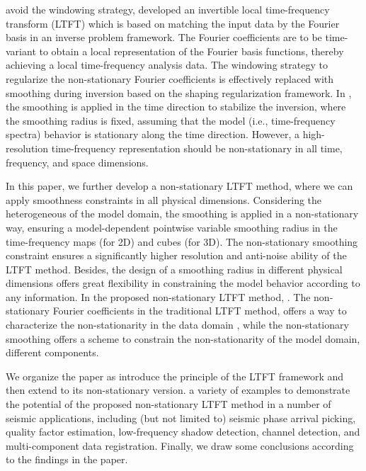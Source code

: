  avoid the windowing strategy, \cite{liuyang2012} developed an invertible local time-frequency transform (LTFT) which is based on matching the input data by the Fourier basis in an inverse problem framework. The Fourier coefficients are  to be time-variant to obtain a local representation of the Fourier basis functions, thereby achieving a local time-frequency analysis data. The windowing strategy to regularize the non-stationary Fourier coefficients is effectively replaced with smoothing during inversion based on the shaping regularization framework.  In \cite{liuyang2012}, the smoothing is applied in the time direction to stabilize the inversion, where the smoothing radius is fixed, assuming that the model (i.e., time-frequency spectra) behavior is stationary along the time direction. However, a high-resolution time-frequency representation should be non-stationary in all time, frequency, and space dimensions. 

In this paper, we further develop a non-stationary LTFT method, where we can apply smoothness constraints in all physical dimensions. Considering the heterogeneous  of the model domain, the smoothing is applied in a non-stationary way,  ensuring a model-dependent pointwise variable smoothing radius in the time-frequency maps (for 2D) and cubes (for 3D). The non-stationary smoothing constraint ensures a significantly higher resolution and anti-noise ability of the LTFT method. Besides, the design of a smoothing radius in different physical dimensions offers great flexibility in constraining the model behavior according to any  information. In the proposed non-stationary LTFT method, . The non-stationary Fourier coefficients in the traditional LTFT method, offers a way to characterize the non-stationarity in the data domain , while the non-stationary smoothing offers a scheme to constrain the non-stationarity of the model domain,  different components.  

We organize the paper as  introduce the principle of the LTFT framework and then extend  to its non-stationary version.  a variety of examples to demonstrate the potential of the proposed non-stationary LTFT method in a number of seismic applications, including (but not limited to) seismic phase arrival picking, quality factor estimation, low-frequency shadow detection, channel detection, and multi-component data registration. Finally, we draw some conclusions according to the findings in the paper.

